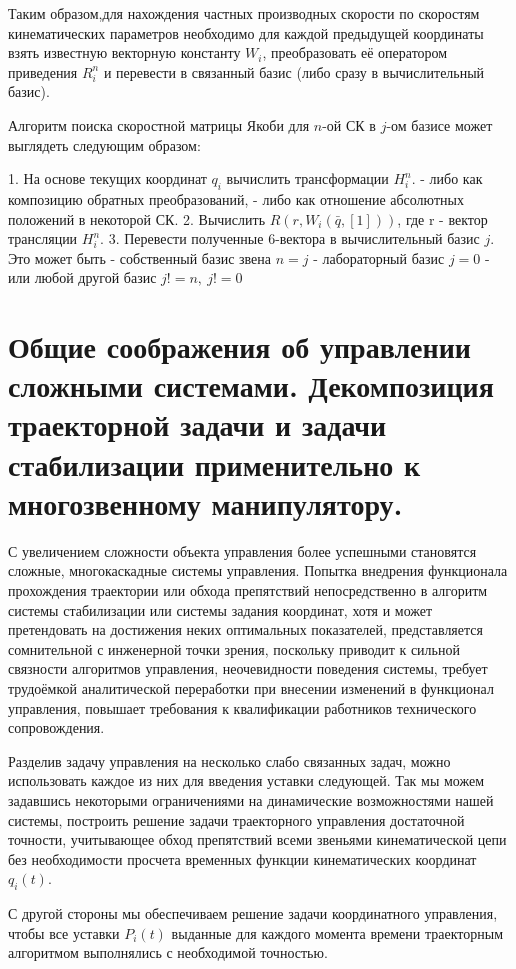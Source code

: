 \documentclass[12pt,a4paper,titlepage]{article}
\begin{document}
Таким образом,для нахождения частных производных скорости по скоростям кинематических параметров необходимо для каждой предыдущей координаты взять известную векторную константу $W_i$, преобразовать её оператором приведения $R^n_i$ и перевести в связанный базис (либо сразу в вычислительный базис). 

Алгоритм поиска скоростной матрицы Якоби для $n$-ой СК в $j$-ом базисе может выглядеть следующим образом:

1. На основе текущих координат $q_i$ вычислить трансформации $H^n_i$.
	- либо как композицию обратных преобразований,
	- либо как отношение абсолютных положений в некоторой СК. 
2. Вычислить $R(r, W_i(\bar{q},[1]))$, где r - вектор трансляции $H^n_i$.
3. Перевести полученные 6-вектора в вычислительный базис $j$. Это может быть 
	- собственный базис звена $n = j$
	- лабораторный базис $j = 0$
	- или любой другой базис $j != n,\ j != 0$

\newpage
\section{Общие соображения об управлении сложными системами. Декомпозиция траекторной задачи и задачи стабилизации применительно к многозвенному манипулятору.}

С увеличением сложности объекта управления более успешными становятся сложные, многокаскадные системы управления. Попытка внедрения функционала прохождения траектории или обхода препятствий непосредственно в алгоритм системы стабилизации или системы задания координат, хотя и может претендовать на достижения неких оптимальных показателей, представляется сомнительной с инженерной точки зрения, поскольку приводит к сильной связности алгоритмов управления, неочевидности поведения системы, требует трудоёмкой аналитической переработки при внесении изменений в функционал управления, повышает требования к квалификации работников технического сопровождения.

Разделив задачу управления на несколько слабо связанных задач, можно использовать каждое из них для введения уставки следующей. Так мы можем задавшись некоторыми ограничениями на динамические возможностями нашей системы, построить решение задачи траекторного управления достаточной точности, учитывающее обход препятствий всеми звеньями кинематической цепи без необходимости просчета временных функции кинематических координат $q_i(t)$. 

С другой стороны мы обеспечиваем решение задачи координатного управления, чтобы все уставки $P_i(t)$ выданные для каждого момента времени траекторным алгоритмом выполнялись с необходимой точностью.
\end{document}

